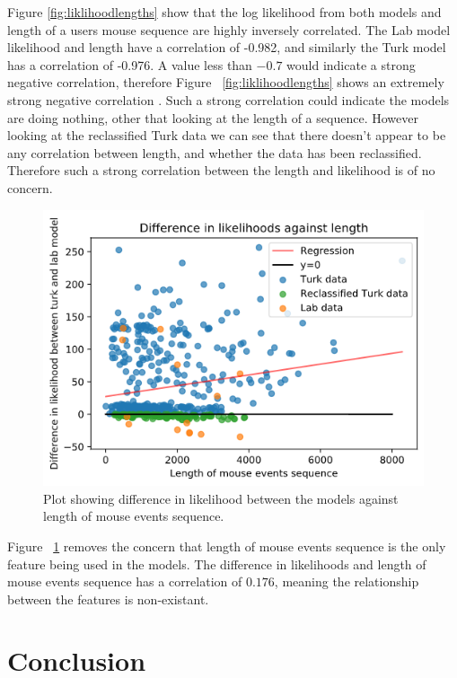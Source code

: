 \documentclass{article}
\begin{document}
Figure \ref{fig:liklihoodlengths} show that the log likelihood from both models and length of a users mouse sequence are highly inversely correlated. 
The Lab model likelihood and length have a correlation of -0.982, and similarly the Turk model has a correlation of -0.976.
A value less than $-0.7$ would indicate a strong negative correlation, therefore Figure ~\ref{fig:liklihoodlengths} shows an extremely strong negative correlation \cite{mindrila2017scatterplots}.
Such a strong correlation could indicate the models are doing nothing, other that looking at the length of a sequence.
However looking at the reclassified Turk data we can see that there doesn't appear to be any correlation between length, and whether the data has been reclassified.
Therefore such a strong correlation between the length and likelihood is of no concern. 

\begin{figure}[ht!]
    \centering
    \includegraphics[scale=0.4]{Images/Difference-Liklihood-Length.png}
    \caption{Plot showing difference in likelihood between the models against length of mouse events sequence. }
    \label{fig:diffliklihoodlengths}
\end{figure}

Figure ~\ref{fig:diffliklihoodlengths} removes the concern that length of mouse events sequence is the only feature being used in the models.
The difference in likelihoods and length of mouse events sequence has a correlation of $0.176$, meaning the relationship between the features is non-existant.

\section{Conclusion}
\end{document}
